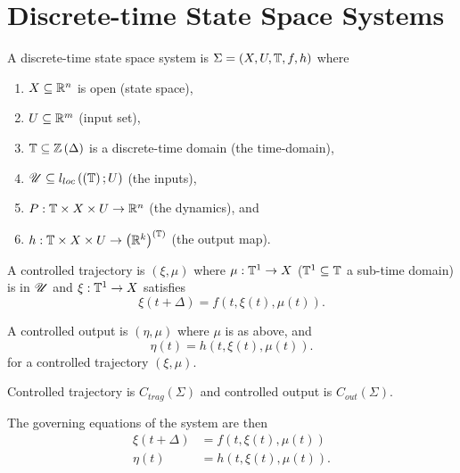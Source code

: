 \section{Discrete-time State Space Systems}
\begin{definition}
	A discrete-time state space system is $\Sigma = \left( X, U, \mathbb{T}, f, h \right) $ where 
	\begin{enumerate}
		\item $X \subseteq \mathbb{R}^{n}$ is open (state space), 
		\item $U \subseteq \mathbb{R}^{m}$ (input set), 
		\item $\mathbb{T} \subseteq \mathbb{Z} \left( \Delta \right) $ is a discrete-time domain (the time-domain), 
		\item $\mathscr{U} \subseteq l_{loc}\left( \left( \mathbb{T} \right) ; U \right)$ (the inputs), 
		\item  $P : \mathbb{T} \times  X \times U  \to \mathbb{R} ^{n}$ (the dynamics), and 
		\item  $h : \mathbb{T} \times  X \times  U \to \left( \mathbb{R}^{k} \right) ^{\left( \mathbb{T} \right) }$ (the output map).
	\end{enumerate}
\end{definition}

\begin{definition}
	A controlled trajectory is $\left( \xi, \mu \right) $ where $\mu : \mathbb{T}^{1} \to X$ ($\mathbb{T} ^{1} \subseteq \mathbb{T} $ a sub-time domain) is in $\mathscr{U}$ and $\xi : \mathbb{T} ^{1} \to X$ satisfies 
	\[
		\xi\left( t + \Delta \right) = f\left( t, \xi\left( t \right) , \mu\left( t \right)  \right) 
	.\] 
\end{definition}

\begin{definition}
	A controlled output is $\left( \eta, \mu \right) $ where $\mu$ is as above, and 
	\[
		\eta\left( t \right) = h\left( t, \xi\left( t \right) , \mu\left( t \right)  \right) 
	.\] 
	for a controlled trajectory $\left( \xi, \mu \right) $. 
\end{definition}

\begin{notation}
	Controlled trajectory is $C_{trag}\left( \Sigma \right) $ and controlled output is $C_{out}\left( \Sigma \right) $.
\end{notation}

The governing equations of the system are then
\begin{align*}
	\xi\left( t + \Delta \right) &= f\left( t, \xi\left( t \right) , \mu\left( t \right)  \right) \\
	\eta\left( t \right) &= h\left( t, \xi\left( t \right) , \mu\left( t \right)  \right) 
.\end{align*}


